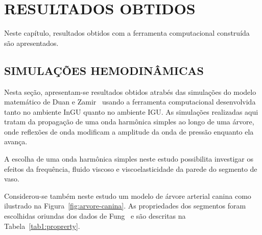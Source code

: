 \chapter{RESULTADOS OBTIDOS}\label{sec:resultados}
\justifying


Neste capítulo, resultados obtidos com a ferramenta computacional construída são apresentados.

\section{SIMULAÇÕES HEMODINÂMICAS}\label{sec:simulacoes}

 Nesta seção, apresentam-se resultados obtidos atrabés das simulações do modelo matemático de Duan e Zamir~\cite{Duan1992} usando a ferramenta computacional desenvolvida tanto no ambiente InGU quanto no ambiente IGU. As simulações realizadas aqui tratam da propagação de uma onda harmônica simples ao longo de uma árvore, onde reflexões de onda modificam a amplitude da onda de pressão enquanto ela avança. 
 
 A escolha de uma onda harmônica simples neste estudo possibilita investigar os efeitos da frequência, fluido viscoso e viscoelasticidade da parede do segmento de vaso.

Considerou-se também neste estudo um modelo de árvore arterial canina como ilustrado na Figura~\ref{fig:arvore-canina}. As propriedades dos segmentos foram escolhidas oriundas dos dados de Fung~\cite{fung2013biomechanics} e são descritas na Tabela~\ref{tab1:proprerty}. 

